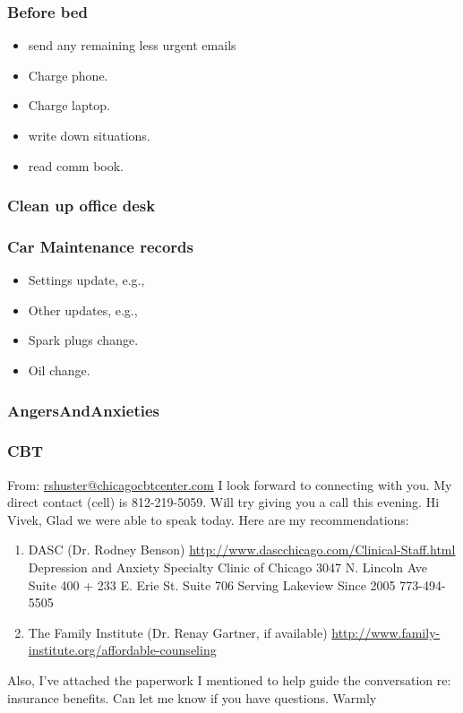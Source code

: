 \begin{frame}
\frametitle{Before bed}
\begin{itemize} 
\small \item \small send any remaining less urgent emails 
\item \small Charge phone. 
\item \small Charge laptop.  
\item \small write down situations. 
\item \small read comm book. 
\end{itemize} 
\end{frame} 

\begin{frame}
\frametitle{Clean up office desk} 
\end{frame} 

\begin{frame}
\frametitle{Car Maintenance records} 
\begin{itemize} 
\small \item \small Settings update, e.g., 
\item \small Other updates, e.g., 
\item \small Spark plugs change. 
\item \small Oil change. 
\end{itemize} 
\end{frame}


\begin{frame}[label=worryElimination]
\frametitle{AngersAndAnxieties}
\end{frame} 

\begin{frame}[label=CBTcomm] 
\frametitle{ CBT } 


From: \url{rshuster@chicagocbtcenter.com}
{\small I look forward to connecting with you. My direct contact (cell) is 812-219-5059. Will try giving you a call this evening. 
Hi Vivek,
Glad we were able to speak today. 
Here are my recommendations: } 

\begin{enumerate}
\tiny \item \tiny  DASC (Dr. Rodney Benson)
\url{http://www.dascchicago.com/Clinical-Staff.html}  Depression and
Anxiety Specialty Clinic of Chicago 3047 N. Lincoln Ave Suite 400 +
233 E. Erie St. Suite 706 Serving Lakeview Since 2005 773-494-5505
\item \tiny The Family Institute (Dr. Renay Gartner, if available)  \url{http://www.family-institute.org/affordable-counseling} 
\end{enumerate}

{\small Also, I've attached the paperwork I mentioned to help guide the
conversation re: insurance benefits. Can let me know if you have
questions. Warmly}

\end{frame} 


